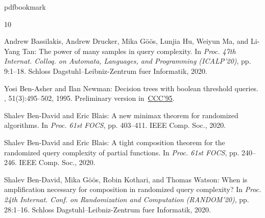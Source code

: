 \documentclass[11pt]{article}
\numberwithin{equation}{section}
\theoremstyle{definition}
\theoremstyle{plain}
\begin{document}
\newcommand{\prelim}{Preliminary version in\ }\newcommand{\prelims}{Preliminary
  versions in\ }
\providecommand{\bibhead}[1]{}
\expandafter\ifx\csname pdfbookmark\endcsname\relax%
  \providecommand{\tocrefpdfbookmark}{}
\else\providecommand{\tocrefpdfbookmark}{%
   \hypertarget{tocreferences}{}%
   \pdfbookmark[1]{References}{tocreferences}}%
\fi

\tocrefpdfbookmark
\begin{thebibliography}{10}

\bibhead{BassilakisDGHMT20}
{\sc Andrew Bassilakis, Andrew Drucker, Mika G{\"{o}}{\"{o}}s, Lunjia Hu,
  Weiyun Ma, and Li-Yang Tan}: The power of many samples in query complexity.
\newblock In {\em Proc. 47th Internat. Colloq. on Automata, Languages, and
  Programming (ICALP'20)}, pp. 9:1--18. Schloss Dagstuhl--Leibniz-Zentrum fuer
  Informatik, 2020.

\bibhead{BenAsherN95}
{\sc Yosi Ben{-}Asher and Ilan Newman}: Decision trees with boolean threshold
  queries.
, 51(3):495--502, 1995.
\newblock \prelim \href{https://doi.org/10.1109/SCT.1995.514729}{CCC'95}.

\bibhead{BenDavidB20a}
{\sc Shalev Ben{-}David and Eric Blais}: A new minimax theorem for randomized
  algorithms.
\newblock In {\em Proc. 61st FOCS}, pp. 403--411. IEEE Comp. Soc., 2020.

\bibhead{BenDavidB20b}
{\sc Shalev Ben{-}David and Eric Blais}: A tight composition theorem for the
  randomized query complexity of partial functions.
\newblock In {\em Proc. 61st FOCS}, pp. 240--246. IEEE Comp. Soc., 2020.

\bibhead{BenDavidGKW20}
{\sc Shalev Ben{-}David, Mika G{\"{o}}{\"{o}}s, Robin Kothari, and Thomas
  Watson}: When is amplification necessary for composition in randomized query
  complexity?
\newblock In {\em Proc. 24th Internat. Conf. on Randomization and Computation
  (RANDOM'20)}, pp. 28:1--16. Schloss Dagstuhl--Leibniz-Zentrum fuer
  Informatik, 2020.


\end{thebibliography}
\end{document}
